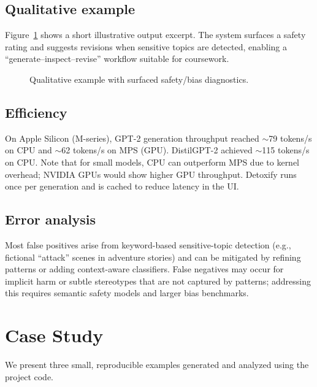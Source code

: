 \documentclass[conference]{IEEEtran}
\begin{document}
\subsection{Qualitative example}
Figure~\ref{fig:example} shows a short illustrative output excerpt. The system surfaces a safety rating and suggests revisions when sensitive topics are detected, enabling a ``generate--inspect--revise'' workflow suitable for coursework.

\begin{figure}[t]
    \centering
    \caption{Qualitative example with surfaced safety/bias diagnostics.}
    \label{fig:example}
\end{figure}

\subsection{Efficiency}
On Apple Silicon (M-series), GPT-2 generation throughput reached $\sim$79 tokens/s on CPU and $\sim$62 tokens/s on MPS (GPU). DistilGPT-2 achieved $\sim$115 tokens/s on CPU. Note that for small models, CPU can outperform MPS due to kernel overhead; NVIDIA GPUs would show higher GPU throughput. Detoxify runs once per generation and is cached to reduce latency in the UI.

\subsection{Error analysis}
Most false positives arise from keyword-based sensitive-topic detection (e.g., fictional ``attack'' scenes in adventure stories) and can be mitigated by refining patterns or adding context-aware classifiers. False negatives may occur for implicit harm or subtle stereotypes that are not captured by patterns; addressing this requires semantic safety models and larger bias benchmarks.

\section{Case Study}
We present three small, reproducible examples generated and analyzed using the project code.
\end{document}
